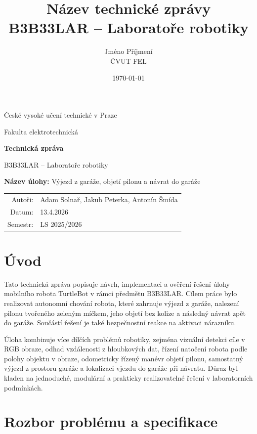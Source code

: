 \documentclass[a4paper,11pt]{article}
\title{\textbf{Název technické zprávy}\\
\large B3B33LAR -- Laboratoře robotiky}
\author{Jméno Příjmení\\
ČVUT FEL\\
}
\date{\today}
\begin{document}
\begin{titlepage}
  \centering
  {\LARGE České vysoké učení technické v Praze\par}
  \vspace{0.6cm}
  {\Large Fakulta elektrotechnická\par}
  \vspace{2.2cm}

  {\Huge \textbf{Technická zpráva}\par}
  \vspace{0.6cm}
  {\LARGE B3B33LAR -- Laboratoře robotiky\par}
  \vspace{1.2cm}

  {\Large \textbf{Název úlohy:} Výjezd z garáže, objetí pilonu a návrat do garáže\par}
  \vspace{2.0cm}

  \begin{tabular}{rl}
    Autoři: & Adam Solnař, Jakub Peterka, Antonín Šmída \\
    Datum: & 13.4.2026 \\
    Semestr: & LS 2025/2026
  \end{tabular}

  \vfill
\end{titlepage}

\setcounter{page}{1}

\tableofcontents
\newpage

\section{Úvod}
Tato technická zpráva popisuje návrh, implementaci a ověření řešení úlohy mobilního robota TurtleBot v rámci předmětu B3B33LAR. Cílem práce bylo realizovat autonomní chování robota, které zahrnuje výjezd z garáže, nalezení pilonu tvořeného zeleným míčkem, jeho objetí bez kolize a následný návrat zpět do garáže. Součástí řešení je také bezpečnostní reakce na aktivaci nárazníku.

Úloha kombinuje více dílčích problémů robotiky, zejména vizuální detekci cíle v RGB obraze, odhad vzdálenosti z hloubkových dat, řízení natočení robota podle polohy objektu v obraze, odometricky řízený manévr objetí pilonu, samostatný výjezd z prostoru garáže a lokalizaci vjezdu do garáže při návratu. Důraz byl kladen na jednoduché, modulární a prakticky realizovatelné řešení v laboratorních podmínkách.

\section{Rozbor problému a specifikace}
\end{document}
